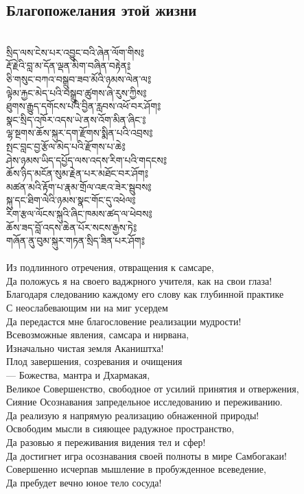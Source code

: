 \subsection{Благопожелания этой жизни}
\\
\ti
སྲིད་ལས་ངེས་པར་འབྱུང་བའི་ཞེན་ལོག་གིས༔\\
རྡོ་རྗེའི་བླ་མ་དོན་ལྡན་མིག་བཞིན་བརྟེན༔\\
ཅི་གསུང་བཀའ་བསྒྲུབ་ཟབ་མོའི་ཉམས་ལེན་ལ༔\\
ལྟེམ་རྐྱང་མེད་པའི་བསྒྲུབ་ཚུགས་ཞེ་རུས་ཀྱིས༔\\
ཐུགས་རྒྱུད་དགོངས་པའི་བྱིན་རླབས་འཕོ་བར་ཤོག༔\\
སྣང་སྲིད་འཁོར་འདས་ཡེ་ནས་འོག་མིན་ཞིང་༔\\
ལྷ་སྔགས་ཆོས་སྐུར་དག་རྫོགས་སྨིན་པའི་འབྲས༔\\
སྤང་བླང་བྱ་རྩོལ་མེད་པའི་རྫོགས་པ་ཆེ༔\\
ཤེས་ཉམས་ཡིད་དཔྱོད་ལས་འདས་རིག་པའི་གདངས༔\\
ཆོས་ཉིད་མངོན་སུམ་རྗེན་པར་མཐོང་བར་ཤོག༔\\
མཚན་མའི་རྟོག་པ་རྣམ་གྲོལ་འཇའ་ཟེར་སྦུབས༔\\
སྐུ་དང་ཐིག་ལེའི་ཉམས་སྣང་གོང་དུ་འཕེལ༔\\
རིག་རྩལ་ལོངས་སྐུའི་ཞིང་ཁམས་ཚད་ལ་ཕེབས༔\\
ཆོས་ཟད་བློ་འདས་ཆེན་པོར་སངས་རྒྱས་ཏེ༔\\
གཞོན་ནུ་བུམ་སྐུར་གཏན་སྲིད་ཟིན་པར་ཤོག༔\\
\\
\ru
Из подлинного отречения, отвращения к самсаре,\\
Да положусь я на своего ваджрного учителя, как на свои глаза!\\
Благодаря следованию каждому его слову как глубинной практике\\
С неослабевающим ни на миг усердем\\
Да передастся мне благословение реализации мудрости!\\
Всевозможные явления, самсара и нирвана,\\
Изначально чистая земля Акаништха!\\
Плод завершения, созревания и очищения\\
— Божества, мантра и Дхармакая,\\
Великое Совершенство, свободное от усилий принятия и отвержения,\\
Сияние Осознавания запредельное исследованию и переживанию.\\
Да реализую я напрямую реализацию обнаженной природы!\\
Освободим мысли в сияющее радужное пространство,\\
Да разовью я переживания видения тел и сфер!\\
Да достигнет игра осознавания своей полноты в мире Самбогакаи!\\
Совершенно исчерпав мышление в пробужденное всеведение,\\
Да пребудет вечно юное тело сосуда!\\
\\
